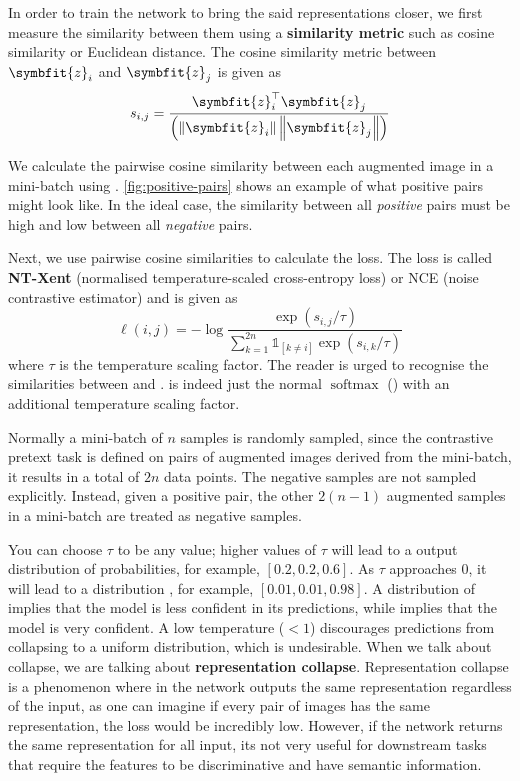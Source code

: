 In order to train the network to bring the said representations closer, we first measure the similarity between them using a \textbf{similarity metric} such as cosine similarity or Euclidean distance. The cosine similarity metric between $\symbfit{z}_i$ and $\symbfit{z}_j$ is given as
\begin{equation}
\label{eqn:simclr-cosine-sim}
s_{i, j}=\frac{\symbfit{z}_{i}^{\top} \symbfit{z}_{j}} {\left(\left\|\symbfit{z}_{i}\right\|\left\|\symbfit{z}_{j}\right\|\right)}
\end{equation}

We calculate the pairwise cosine similarity between each augmented image in a mini-batch using . \cref{fig:positive-pairs} shows an example of what positive pairs might look like. In the ideal case, the similarity between all \textit{positive} pairs must be high and low between all \textit{negative} pairs.

Next, we use pairwise cosine similarities to calculate the loss. The loss is called \textbf{NT-Xent} (normalised temperature-scaled cross-entropy loss) or NCE (noise contrastive estimator) and is given as
\begin{equation}
\ell(i, j)=-\log \frac{\exp \left(s_{i, j} / \tau\right)}{\sum_{k=1}^{2 n} \mathbb{1}_{[k \neq i]} \exp \left(s_{i, k} / \tau\right)}
\label{eqn:nt-xent}
\end{equation}
where $\tau$ is the temperature scaling factor. The reader is urged to recognise the similarities between  and .  is indeed just the normal $\operatorname{softmax}$ () with an additional temperature scaling factor.

Normally a mini-batch of $n$ samples is randomly sampled, since the contrastive pretext task is defined on pairs of augmented images derived from the mini-batch, it results in a total of $2n$ data points. The negative samples are not sampled explicitly. Instead, given a positive pair, the other $2(n-1)$ augmented samples in a mini-batch are treated as negative samples.

You can choose $\tau$ to be any value; higher values of $\tau$ will lead to a  output distribution of probabilities, for example, $\left[0.2,0.2,0.6\right]$.
As $\tau$ approaches $0$, it will lead to a distribution , for example, $\left[0.01,0.01,0.98\right]$.
A distribution of  implies that the model is less confident in its predictions, while  implies that the model is very confident.
A low temperature ($<1$) discourages predictions from collapsing to a uniform distribution, which is undesirable. When we talk about collapse, we are talking about \textbf{representation collapse}. Representation collapse is a phenomenon where in the network outputs the same representation regardless of the input, as one can imagine if every pair of images has the same representation, the loss would be incredibly low. However, if the network returns the same representation for all input, its not very useful for downstream tasks that require the features to be discriminative and have semantic information.

